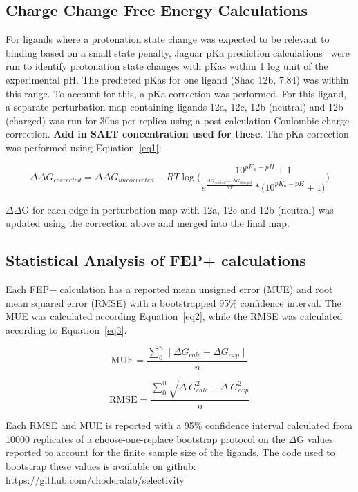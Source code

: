 \documentclass[phd,tocprelim]{cornell}
\begin{document}
\subsection{Charge Change Free Energy Calculations} 
For ligands where a protonation state change was expected to be relevant to binding based on a small state penalty, Jaguar pKa prediction calculations~\citep{Bochevarov2013-bn} were run to identify protonation state changes with pKas within 1 log unit of the experimental pH. The predicted pKas for one ligand (Shao 12b, 7.84) was within this range. To account for this, a pKa correction was performed. For this ligand, a separate perturbation map containing ligands 12a, 12c, 12b (neutral) and 12b (charged) was run for 30ns per replica using a post-calculation Coulombic charge correction. \textbf{Add in SALT concentration used for these}. The pKa correction was performed using Equation~\ref{eq1}: 

\begin{equation}\label{eq1}
\Delta\Delta G_{corrected} = \Delta\Delta G_{uncorrected} - RT\log\Bigg(\frac{10^{pK_a -pH}+1}{e^{\frac{\Delta G_{neutral} - \Delta G_{charged}}{RT}} * \big(10^{pK_a - pH}+1\big)}\Bigg)
\end{equation}

$\Delta\Delta$G for each edge in perturbation map with 12a, 12c and 12b (neutral) was updated using the correction above and merged into the final map. 

 
\subsection{Statistical Analysis of FEP+ calculations}
Each FEP+ calculation has a reported mean unsigned error (MUE) and root mean squared error (RMSE) with a bootstrapped 95\% confidence interval. The MUE was calculated according Equation~\ref{eq2}, while the RMSE was calculated according to Equation~\ref{eq3}. 

\begin{equation}\label{eq2}
\text{MUE} = \frac{ \sum_{0}^{n} \mid \Delta G _{calc} - \Delta G _{exp} \mid}{n}
 \end{equation}
 
 \begin{equation}\label{eq3}
\text{RMSE} = \frac{ \sum_{0}^{n} \sqrt{\Delta~G_{calc}^2 - \Delta~G_{exp}^2}}{n} 
 \end{equation}
 
 Each RMSE and MUE is reported with a 95\% confidence interval calculated from 10000 replicates of a choose-one-replace bootstrap protocol on the $\Delta$G values reported to account for the finite sample size of the ligands. The code used to bootstrap these values is available on github: https://github.com/choderalab/selectivity
 
\end{document}
